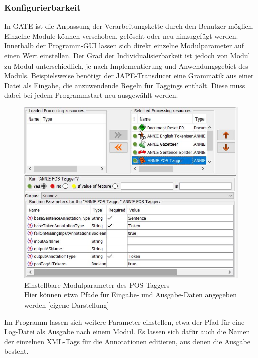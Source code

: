 \documentclass[12pt]{report}
\begin{document}
\subsubsection{Konfigurierbarkeit}
In GATE ist die Anpassung der Verarbeitungskette durch den Benutzer möglich. Einzelne Module können verschoben, gelöscht oder neu hinzugefügt werden. Innerhalb der Programm-GUI lassen sich direkt einzelne Modulparameter auf einen Wert einstellen. Der Grad der Individualisierbarkeit ist jedoch von Modul zu Modul unterschiedlich, je nach Implementierung und Anwendungsgebiet des Moduls. Beispielsweise benötigt der JAPE-Transducer eine Grammatik aus einer Datei als Eingabe, die anzuwendende Regeln für Taggings enthält. Diese muss dabei bei jedem Programmstart neu ausgewählt werden.

\begin{figure}[h!]
\begin{center}
\includegraphics[scale=0.8]{GATE_Bilder/POSTagger.jpg}
\caption{Einstellbare Modulparameter des POS-Taggers \\ Hier können etwa Pfade für Eingabe- und Ausgabe-Daten angegeben werden [eigene Darstellung]}
\end{center}
\end{figure} 

Im Programm lassen sich weitere Parameter einstellen, etwa der Pfad für eine Log-Datei als Ausgabe nach einem Modul. Es lassen sich dafür auch die Namen der einzelnen XML-Tags für die Annotationen editieren, aus denen die Ausgabe besteht.
\end{document}
